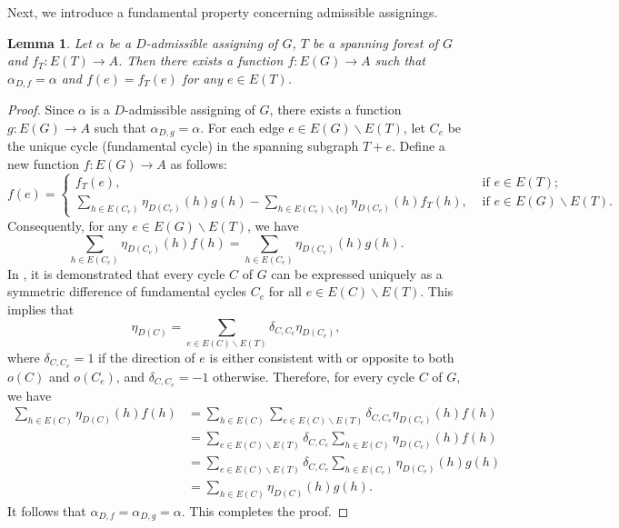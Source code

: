 \documentclass[12pt]{article}%
\numberwithin{equation}{section}
\newtheorem{lemma}[lemma]{Lemma}
\begin{document}
Next, we introduce a fundamental property concerning admissible assignings.
\begin{lemma}\label{Admissible}
Let $\alpha$ be a $D$-admissible assigning of $G$, $T$ be a spanning forest of $G$ and $f_T:E(T)\to A$. Then there exists a function $f:E(G)\to A$ such that $\alpha_{D,f}=\alpha$ and $f(e)=f_T(e)$ for any $e\in E(T)$.
\end{lemma}
\begin{proof}
Since $\alpha$ is a $D$-admissible assigning of $G$, there exists a function $g:E(G)\to A$ such that $\alpha_{D,g}=\alpha$. For each edge $e\in E(G)\smallsetminus E(T)$, let $C_e$ be the unique cycle (fundamental cycle) in the spanning subgraph $T+e$. Define a new function $f:E(G)\to A$ as follows:
\[
f(e)=\begin{cases}
f_T(e),& \text{ if } e\in E(T);\\
\sum_{h\in E(C_e)}\eta_{D(C_e)}(h)g(h)-\sum_{h\in E(C_e)\smallsetminus\{e\}}\eta_{D(C_e)}(h)f_T(h),& \mbox{ if } e\in E(G)\smallsetminus E(T).
\end{cases}
\]
Consequently, for any $e\in E(G)\smallsetminus E(T)$, we have
\[
\sum_{h\in E(C_e)}\eta_{D(C_e)}(h)f(h)=\sum_{h\in E(C_e)}\eta_{D(C_e)}(h)g(h).
\]
In \cite[Corollary 4.11]{Bondy2008}, it is demonstrated that every cycle $C$ of $G$ can be expressed uniquely as a symmetric difference of fundamental cycles  $C_e$ for all $e\in E(C)\smallsetminus E(T)$.
This implies that
\[
\eta_{D(C)}=\sum_{e\in E(C)\smallsetminus E(T)}\delta_{C,C_e}\eta_{D(C_e)},
\]
where $\delta_{C,C_e}=1$ if the direction of $e$ is either consistent with or opposite to both $o(C)$ and $o(C_e)$, and $\delta_{C,C_e}=-1$ otherwise. Therefore, for every cycle $C$ of $G$, we have
\begin{align*}
\sum_{h\in E(C)}\eta_{D(C)}(h)f(h)&=\sum_{h\in E(C)}\sum_{e\in E(C)\smallsetminus E(T)}\delta_{C,C_e}\eta_{D(C_e)}(h)f(h)\\
&=\sum_{e\in E(C)\smallsetminus E(T)}\delta_{C,C_e}\sum_{h\in E(C)}\eta_{D(C_e)}(h)f(h)\\
&=\sum_{e\in E(C)\smallsetminus E(T)}\delta_{C,C_e}\sum_{h\in E(C_e)}\eta_{D(C_e)}(h)g(h)\\
&=\sum_{h\in E(C)}\eta_{D(C)}(h)g(h).
\end{align*}
It follows that $\alpha_{D,f}=\alpha_{D,g}=\alpha$. This completes the proof.
\end{proof}
\end{document}
